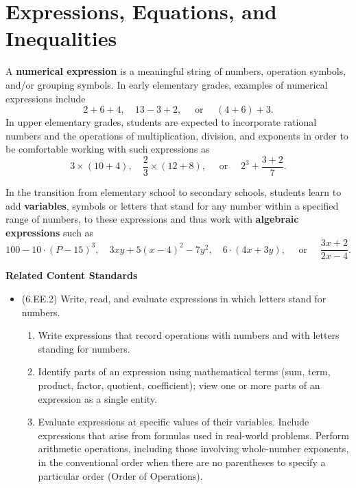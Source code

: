 \documentclass[
]{book}
\providecommand{\tightlist}{%
  \setlength{\itemsep}{0pt}\setlength{\parskip}{0pt}}
\newenvironment{standards}{}{}
\theoremstyle{definition}
\theoremstyle{definition}
\theoremstyle{definition}
\theoremstyle{definition}
\theoremstyle{remark}
\begin{document}
\hypertarget{expressions-equations-and-inequalities}{%
\section{Expressions, Equations, and Inequalities}\label{expressions-equations-and-inequalities}}

A \textbf{numerical expression} is a meaningful string of numbers, operation symbols, and/or grouping symbols. In early elementary grades, examples of numerical expressions include \[2+6+4, \quad 13-3+2, \quad \mbox{ or } \quad (4+6)+3.\] In upper elementary grades, students are expected to incorporate rational numbers and the operations of multiplication, division, and exponents in order to be comfortable working with such expressions as
\[3 \times (10+4), \quad \frac{2}{3} \times (12+8), \quad \mbox{ or } \quad  2^3 + \frac{3+2}{7}.\]

In the transition from elementary school to secondary schools, students learn to add \textbf{variables}, symbols or letters that stand for any number within a specified range of numbers, to these expressions and thus work with \textbf{algebraic expressions} such as
\[100-10\cdot (P-15)^3,  \quad 3xy + 5(x-4)^2-7y^2, \quad 6\cdot (4x+3y), \quad \mbox{ or }\quad  \frac{3x+2}{2x-4}.\]

\begin{standards}

\begin{center}
\textbf{Related Content Standards}

\end{center}

\begin{itemize}
\item
  (6.EE.2) Write, read, and evaluate expressions in which letters stand for numbers.

  \begin{enumerate}
  \def\labelenumi{\alph{enumi}.}
  \tightlist
  \item
    Write expressions that record operations with numbers and with letters standing for numbers.
  \item
    Identify parts of an expression using mathematical terms (sum, term, product, factor, quotient, coefficient); view one or more parts of an expression as a single entity.
  \item
    Evaluate expressions at specific values of their variables. Include expressions that arise from formulas used in real-world problems. Perform arithmetic operations, including those involving whole-number exponents, in the conventional order when there are no parentheses to specify a particular order (Order of Operations).
  \end{enumerate}
\end{itemize}

\end{standards}
\end{document}

